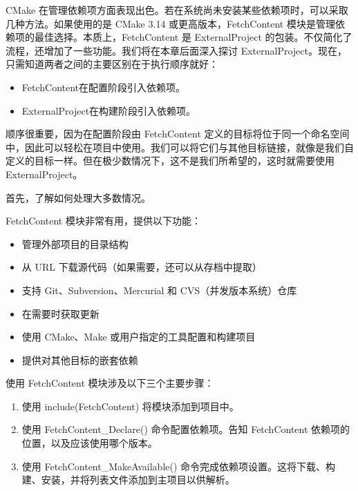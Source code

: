 
CMake 在管理依赖项方面表现出色。若在系统尚未安装某些依赖项时，可以采取几种方法。如果使用的是 CMake 3.14 或更高版本，FetchContent 模块是管理依赖项的最佳选择。本质上，FetchContent 是 ExternalProject 的包装。不仅简化了流程，还增加了一些功能。我们将在本章后面深入探讨 ExternalProject。现在，只需知道两者之间的主要区别在于执行顺序就好：

\begin{itemize}
\item
FetchContent在配置阶段引入依赖项。

\item
ExternalProject在构建阶段引入依赖项。
\end{itemize}

顺序很重要，因为在配置阶段由 FetchContent 定义的目标将位于同一个命名空间中，因此可以轻松在项目中使用。我们可以将它们与其他目标链接，就像是我们自定义的目标一样。但在极少数情况下，这不是我们所希望的，这时就需要使用 ExternalProject。

首先，了解如何处理大多数情况。


FetchContent 模块非常有用，提供以下功能：

\begin{itemize}
\item
管理外部项目的目录结构

\item
从 URL 下载源代码（如果需要，还可以从存档中提取）

\item
支持 Git、Subversion、Mercurial 和 CVS（并发版本系统）仓库

\item
在需要时获取更新

\item
使用 CMake、Make 或用户指定的工具配置和构建项目

\item
提供对其他目标的嵌套依赖
\end{itemize}

使用 FetchContent 模块涉及以下三个主要步骤：

\begin{enumerate}
\item
使用 include(FetchContent) 将模块添加到项目中。

\item
使用 FetchContent\_Declare() 命令配置依赖项。告知 FetchContent 依赖项的位置，以及应该使用哪个版本。

\item
使用 FetchContent\_MakeAvailable() 命令完成依赖项设置。这将下载、构建、安装，并将列表文件添加到主项目以供解析。
\end{enumerate}

